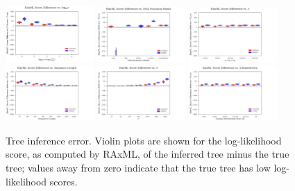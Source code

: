 \begin{figure} %
\centering
\includegraphics[width=0.3\textwidth]{figs/dualbirth-tree-score-diff-a}
\includegraphics[width=0.3\textwidth]{figs/dualbirth-tree-score-diff-b}
\includegraphics[width=0.3\textwidth]{figs/dualbirth-tree-score-diff-c}\\
\includegraphics[width=0.3\textwidth]{figs/dualbirth-tree-score-diff-d}
\includegraphics[width=0.3\textwidth]{figs/dualbirth-tree-score-diff-e}
\includegraphics[width=0.3\textwidth]{figs/dualbirth-tree-score-diff-f}
\caption[Robinson--Foulds Distance]
{Tree inference error. Violin plots are shown for the log-likelihood score, as computed by RAxML, of the inferred tree minus the true tree; values away from zero indicate that the true tree has low log-likelihood scores.}
\label{fig:dualbirth-tree-score-diff}
\end{figure}

